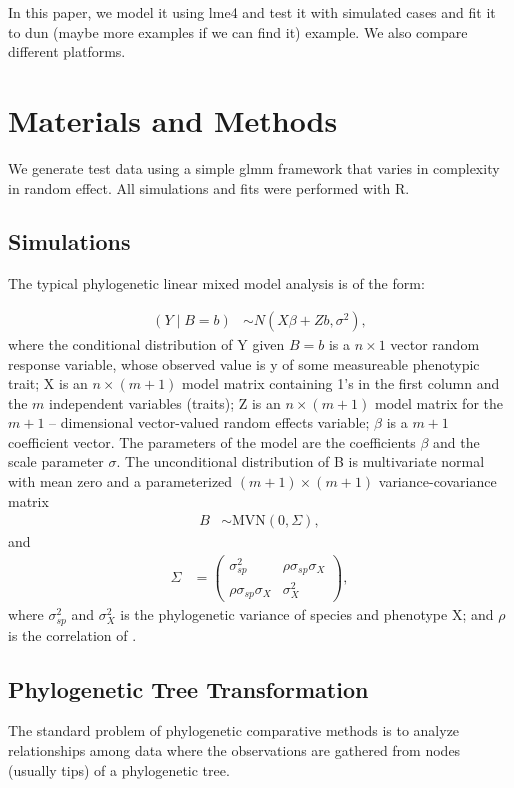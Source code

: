 \documentclass[12pt]{article}
\begin{document}
In this paper, we model it using lme4 and test it with simulated cases and fit it to dun (maybe more examples if we can find it) example. 
We also compare different platforms. 

\section{Materials and Methods}

We generate test data using a simple glmm framework that varies in complexity in random effect. All simulations and fits were performed with R. 

\subsection{Simulations}

The typical phylogenetic linear mixed model analysis is of the form:

\begin{align}
(Y \mid B=b) & \sim N(X\beta + Zb, \sigma^{2}),
\end{align}
where the conditional distribution of Y given $ B = b$ is a $n \times 1$ vector random response variable, whose observed value is y of some measureable phenotypic trait; 
X is an $n \times (m + 1)$ model matrix containing 1's in the first column and the $m$ independent variables (traits);
Z is an $n \times (m + 1)$ model matrix for the $m + 1$ -- dimensional vector-valued random effects variable; 
$\beta$ is a $ m + 1 $ coefficient vector.
The parameters of the model are the coefficients $\beta$ and the scale parameter $\sigma$.
The unconditional distribution of B is multivariate normal with mean zero and a parameterized $(m + 1) \times (m + 1)$ variance-covariance matrix
\begin{align}
B & \sim \mathrm{MVN}(0,\Sigma),
\end{align}
and
\begin{align}
\Sigma & = \begin{pmatrix} \sigma^2_{sp} & \rho \sigma_{sp} \sigma_{X} \\ \rho \sigma_{sp} \sigma_{X} & \sigma^2_{X} \end{pmatrix},
\end{align}
where $\sigma^{2}_{sp}$ and $\sigma^{2}_{X}$ is the phylogenetic variance of species and phenotype X; 
and $\rho$ is the correlation of .


\subsection{Phylogenetic Tree Transformation}
The standard problem of phylogenetic comparative methods is to analyze relationships among data where the observations are gathered from nodes (usually tips) of a phylogenetic tree. 
\end{document}
